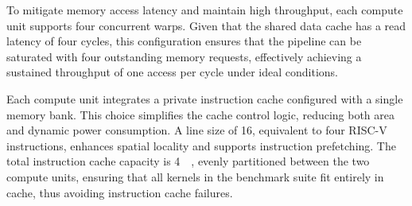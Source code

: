            To mitigate memory access latency and maintain high throughput, each compute unit supports four concurrent warps. Given that the shared data cache has a read latency of four cycles, this configuration ensures that the pipeline can be saturated with four outstanding memory requests, effectively achieving a sustained throughput of one access per cycle under ideal conditions.
        
            Each compute unit integrates a private instruction cache configured with a single memory bank. This choice simplifies the cache control logic, reducing both area and dynamic power consumption. A line size of \SI{16}{\byte}, equivalent to four RISC-V instructions, enhances spatial locality and supports instruction prefetching. The total instruction cache capacity is \SI{4}{\kibi\byte}, evenly partitioned between the two compute units, ensuring that all kernels in the benchmark suite fit entirely in cache, thus avoiding instruction cache failures.

            \begin{table}[tp]
                \caption{Summary of benchmark workloads used to evaluate the \mbox{e-GPU} architecture.}
                \label{tbl:benchmarks}
                \centering
            \end{table}
        
